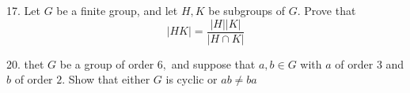 \begin{mdframed}[style=darkQuesion]
  17. Let $G$ be a finite group, and let $H, K$ be subgroups of $G .$ Prove that
$$
|H K|=\frac{|H||K|}{|H \cap K|}
$$ 
\end{mdframed}
\begin{mdframed}[style=darkAnswer,frametitle={Joe Starr}]
  
\end{mdframed}
\newpage
\begin{mdframed}[style=darkQuesion]
20. thet $G$ be a group of order $6,$ and suppose that $a, b \in G$ with $a$ of order 3 and $b$ of order $2 .$ Show that either $G$ is cyclic or $a b \neq b a$
\end{mdframed}
\begin{mdframed}[style=darkAnswer,frametitle={Joe Starr}]
  
\end{mdframed}
